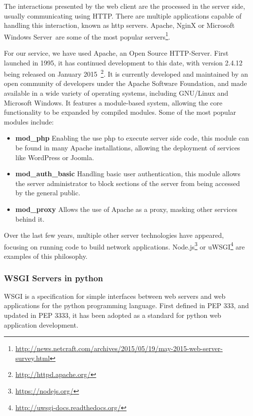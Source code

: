 
The interactions presented by the web client are the processed in the server side, usually communicating using HTTP. There are multiple applications capable of handling this interaction, known as http servers. Apache, NginX or Microsoft Windows Server\textregistered~are some of the most popular servers\footnote{\url{http://news.netcraft.com/archives/2015/05/19/may-2015-web-server-survey.html}}. 

For our service, we have used Apache\cite{apacheabout}, an Open Source HTTP-Server. First launched in 1995, it has continued development to this date, with version 2.4.12 being released on January 2015~\footnote{\url{http://httpd.apache.org/}}. It is currently developed and maintained by an open community of developers under the Apache Software Foundation, and made available in a wide variety of operating systems, including GNU/Linux and Microsoft Windows\textregistered. It features a module-based system, allowing the core functionality to be expanded by compiled modules. Some of the most popular modules include:

\begin{itemize}[topsep=0pt,itemsep=-1ex,partopsep=1ex,parsep=1ex]
 \item \textbf{mod\_php} Enabling the use php to execute server side code, this module can be found in many Apache installations, allowing the deployment of services like WordPress or Joomla.
 \item \textbf{mod\_auth\_basic} Handling basic user authentication, this module allows the server administrator to block sections of the server from being accessed by the general public.
 \item \textbf{mod\_proxy} Allows the use of Apache as a proxy, masking other services behind it.
\end{itemize}

Over the last few years, multiple other server technologies have appeared, focusing on running code to build network applications. Node.js\footnote{\url{https://nodejs.org/}} or uWSGI\footnote{\url{http://uwsgi-docs.readthedocs.org/}} are examples of this philosophy.

\subsubsection{WSGI Servers in python}

\ac{WSGI} is a specification for simple interfaces between web servers and web applications for the python programming language. First defined in PEP 333\cite{pep0333}, and updated in PEP 3333\cite{pep3333}, it has been adopted as a standard for python web application development.

